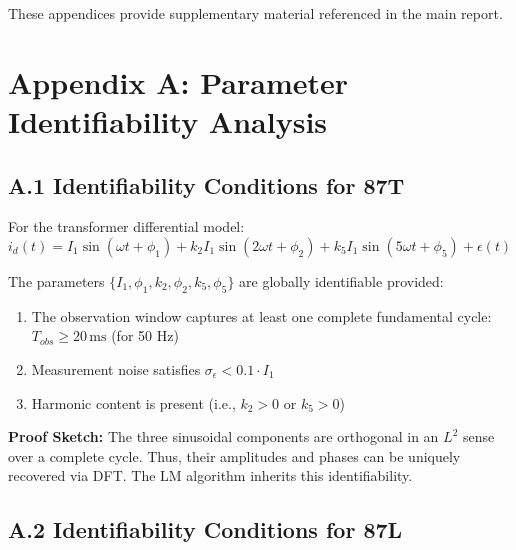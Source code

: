 
These appendices provide supplementary material referenced in the main report.


\section*{Appendix A: Parameter Identifiability Analysis}

\subsection*{A.1 Identifiability Conditions for 87T}

For the transformer differential model:
$$i_d(t) = I_1 \sin(\omega t + \phi_1) + k_2 I_1 \sin(2\omega t + \phi_2) + k_5 I_1 \sin(5\omega t + \phi_5) + \epsilon(t)$$

The parameters $\{I_1, \phi_1, k_2, \phi_2, k_5, \phi_5\}$ are globally identifiable provided:

\begin{enumerate}
    \item The observation window captures at least one complete fundamental cycle: $T_{obs} \geq 20\,\text{ms}$ (for 50 Hz)
    \item Measurement noise satisfies $\sigma_\epsilon < 0.1 \cdot I_1$
    \item Harmonic content is present (i.e., $k_2 > 0$ or $k_5 > 0$)
\end{enumerate}

\textbf{Proof Sketch:} The three sinusoidal components are orthogonal in an $L^2$ sense over 
a complete cycle. Thus, their amplitudes and phases can be uniquely recovered via DFT. 
The LM algorithm inherits this identifiability.

\subsection*{A.2 Identifiability Conditions for 87L}

